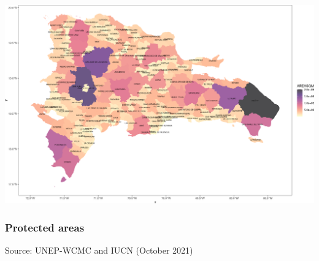 \documentclass[10pt,landscape,a3paper]{article}
\begin{document}
\begin{center}\includegraphics{img/data-download-preparation-eda/administrative-2} \end{center}

\hypertarget{protected-areas}{%
\subsubsection{Protected areas}\label{protected-areas}}

Source: UNEP-WCMC and IUCN (October 2021)
\end{document}
